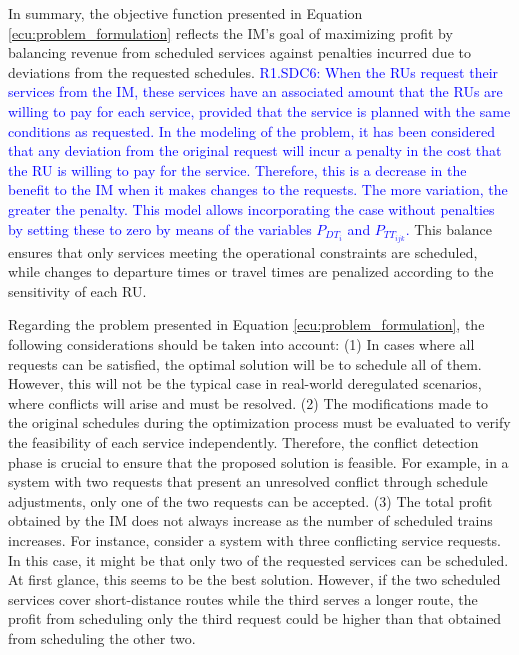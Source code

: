 \documentclass[Afour,sagev,times]{sagej}
\newcommand{\primero}[1]{\textcolor{blue}{#1}}
\begin{document}
In summary, the objective function presented in Equation \ref{ecu:problem_formulation} reflects the \gls{IM}'s goal of maximizing profit by balancing revenue from scheduled services against penalties incurred due to deviations from the requested schedules. \primero{R1.SDC6: When the \glspl{RU} request their services from the \gls{IM}, these services have an associated amount that the \glspl{RU} are willing to pay for each service, provided that the service is planned with the same conditions as requested. In the modeling of the problem, it has been considered that any deviation from the original request will incur a penalty in the cost that the \gls{RU} is willing to pay for the service. Therefore, this is a decrease in the benefit to the \gls{IM} when it makes changes to the requests. The more variation, the greater the penalty. This model allows incorporating the case without penalties by setting these to zero by means of the variables $P_{{DT}_{{i}}}$ and $P_{TT_{ijk}}$.} This balance ensures that only services meeting the operational constraints are scheduled, while changes to departure times or travel times are penalized according to the sensitivity of each \gls{RU}. 

Regarding the problem presented in Equation \ref{ecu:problem_formulation}, the following considerations should be taken into account: (1) In cases where all requests can be satisfied, the optimal solution will be to schedule all of them. However, this will not be the typical case in real-world deregulated scenarios, where conflicts will arise and must be resolved. (2) The modifications made to the original schedules during the optimization process must be evaluated to verify the feasibility of each service independently. Therefore, the conflict detection phase is crucial to ensure that the proposed solution is feasible. For example, in a system with two requests that present an unresolved conflict through schedule adjustments, only one of the two requests can be accepted. (3) The total profit obtained by the \gls{IM} does not always increase as the number of scheduled trains increases. For instance, consider a system with three conflicting service requests. In this case, it might be that only two of the requested services can be scheduled. At first glance, this seems to be the best solution. However, if the two scheduled services cover short-distance routes while the third serves a longer route, the profit from scheduling only the third request could be higher than that obtained from scheduling the other two.
\end{document}
